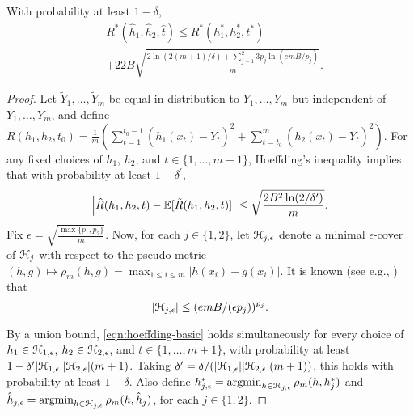 \documentclass{article}
\begin{document}
\begin{theorem}
\label{thm:main}
With probability at least $1-\delta$, 
\begin{align*}
 &R^{*}(\hat{h}_{1},\hat{h}_{2},\hat{t})
\leq  R^{*}(h_{1}^{*},h_{2}^{*},t^{*}) \\
 &+ 22 B \sqrt{\frac{2 \ln(2 (m+1)/\delta) + \sum_{j=1}^{2} 3 p_{j} \ln( e m B / p_{j} )}{m}}.
\end{align*}
\end{theorem}
\begin{proof}
Let $\tilde{Y}_{1},\ldots,\tilde{Y}_{m}$ be equal in distribution to $Y_{1},\ldots,Y_{m}$ but independent of $Y_{1},\ldots,Y_{m}$,
and define $\tilde{R}(h_{1},h_{2},t_{0}) = \frac{1}{m} \left( \sum_{t=1}^{t_{0}-1} ( h_{1}(x_{t}) - \tilde{Y}_{t} )^{2} + \sum_{t=t_{0}}^{m} ( h_{2}(x_{t}) - \tilde{Y}_{t} )^{2} \right)$.
For any fixed choices of $h_{1}$, $h_{2}$, and $t \in \{1,\ldots,m+1\}$,
Hoeffding's inequality implies that with probability at least $1-\delta^{\prime}$, 
\begin{equation}
\label{eqn:hoeffding-basic}
\left| \hat{R}(h_{1},h_{2},t) - \mathbb{E}[ \tilde{R}(h_{1},h_{2},t) ] \right|
\leq \sqrt{\frac{2 B^{2} \ln(2/\delta^{\prime})}{m}}.
\end{equation}
Fix $\epsilon = \sqrt{\frac{\max\{p_{1},p_{2}\}}{m}}$.
Now, for each $j \in \{1,2\}$, let $\mathcal H_{j,\epsilon}$ denote a minimal $\epsilon$-cover of $\mathcal H_{j}$ with respect to the pseudo-metric 
$(h,g) \mapsto \rho_{m}(h,g) = \max_{1 \leq i \leq m} | h(x_{i}) - g(x_{i}) |$.
It is known (see e.g., \cite{anthony:99}) that 
\begin{equation}
\label{eqn:cover-size}
|\mathcal H_{j,\epsilon}| \leq (e m B / (\epsilon p_{j}))^{p_{j}}.
\end{equation}

By a union bound, \eqref{eqn:hoeffding-basic} holds simultaneously for every choice of 
$h_{1} \in \mathcal H_{1,\epsilon}$, $h_{2} \in \mathcal H_{2,\epsilon}$, and $t \in \{1,\ldots,m+1\}$,
with probability at least $1 - \delta^{\prime} |\mathcal H_{1,\epsilon}| |\mathcal H_{2,\epsilon}| (m+1)$.
Taking $\delta^{\prime} = \delta / ( |\mathcal H_{1,\epsilon}| |\mathcal H_{2,\epsilon}| (m+1) )$, this holds with probability at least $1-\delta$.
Also define $h_{j,\epsilon}^{*} = \mathop{\rm argmin}_{h \in \mathcal H_{j,\epsilon}} \rho_{m}(h,h_{j}^{*})$
and $\hat{h}_{j,\epsilon} = \mathop{\rm argmin}_{h \in \mathcal H_{j,\epsilon}} \rho_{m}(h,\hat{h}_{j})$, for each $j \in \{1,2\}$.


\end{proof}
\end{document}
